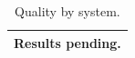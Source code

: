 \begin{table}[t]
\centering\small
\begin{tabular}{l}
\toprule
Results pending. \\
\bottomrule
\end{tabular}
\caption{Quality by system.}
\label{tab:quality}
\end{table}
